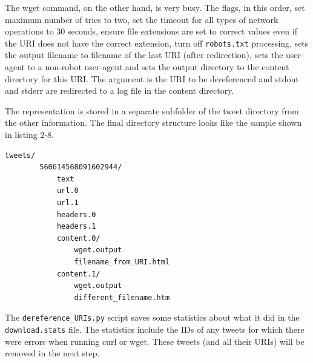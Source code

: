 \documentclass[a4paper,12pt]{article}
\begin{document}
The wget command, on the other hand, is very busy. The flags, in this order, set maximum number of tries
to two, set the timeout for all types of network operations to 30 seconds, ensure file extensions are set to
correct values even if the URI does not have the correct extension, turn off \texttt{robots.txt} processing,
sets the output filename to filename of the last URI (after redirection), sets the user-agent to a
non-robot user-agent and sets the output directory to the content directory for this URI. The argument is
the URI to be dereferenced and stdout and stderr are redirected to a log file in the content directory.

The representation is stored in a separate subfolder of the tweet directory from the other information.
The final directory structure looks like the sample shown in listing 2-8.
\begin{lstlisting}[basicstyle=\ttfamily,caption={Sample Final Directory Structure}]
    tweets/
        560614568091602944/
            text
            url.0
            url.1
            headers.0
            headers.1
            content.0/
                wget.output
                filename_from_URI.html
            content.1/
                wget.output
                different_filename.htm
\end{lstlisting}
The \texttt{dereference\_URIs.py} script saves some statistics about what it did in the
\texttt{download.stats} file. The statistics include the IDs of any tweets for which there were errors
when running curl or wget. These tweets (and all their URIs) will be removed in the next step.
\end{document}
